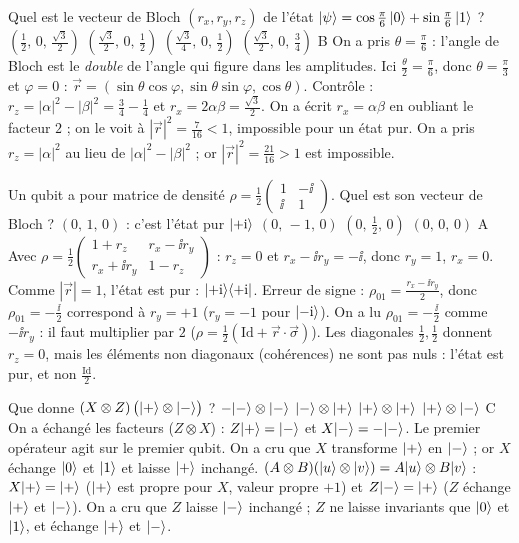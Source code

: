   {Quel est le vecteur de Bloch $(r_x,r_y,r_z)$ de l'état $|\psi\rangle=\cos\frac\pi6\,|0\rangle+\sin\frac\pi6\,|1\rangle$ ?}
  {$\left(\frac12,\,0,\,\frac{\sqrt3}{2}\right)$}
  {$\left(\frac{\sqrt3}{2},\,0,\,\frac12\right)$}
  {$\left(\frac{\sqrt3}{4},\,0,\,\frac12\right)$}
  {$\left(\frac{\sqrt3}{2},\,0,\,\frac34\right)$}
  {B}
\qcmx
  {On a pris $\theta=\frac\pi6$ : l'angle de Bloch est le \emph{double} de l'angle qui figure dans les amplitudes.}
  {Ici $\frac\theta2=\frac\pi6$, donc $\theta=\frac\pi3$ et $\varphi=0$ : $\vec r=(\sin\theta\cos\varphi,\sin\theta\sin\varphi,\cos\theta)$. Contrôle : $r_z=|\alpha|^2-|\beta|^2=\frac34-\frac14$ et $r_x=2\alpha\beta=\frac{\sqrt3}2$.}
  {On a écrit $r_x=\alpha\beta$ en oubliant le facteur $2$ ; on le voit à $|\vec r|^2=\frac7{16}<1$, impossible pour un état pur.}
  {On a pris $r_z=|\alpha|^2$ au lieu de $|\alpha|^2-|\beta|^2$ ; or $|\vec r|^2=\frac{21}{16}>1$ est impossible.}

  {Un qubit a pour matrice de densité $\rho=\frac12\begin{pmatrix}1&-\ii\\\ii&1\end{pmatrix}$. Quel est son vecteur de Bloch ?}
  {$(0,\,1,\,0)$ : c'est l'état pur $|{+}\mathrm{i}\rangle$}
  {$(0,\,-1,\,0)$}
  {$\left(0,\,\frac12,\,0\right)$}
  {$(0,\,0,\,0)$}
  {A}
\qcmx
  {Avec $\rho=\frac12\begin{pmatrix}1+r_z&r_x-\ii r_y\\r_x+\ii r_y&1-r_z\end{pmatrix}$ : $r_z=0$ et $r_x-\ii r_y=-\ii$, donc $r_y=1$, $r_x=0$. Comme $|\vec r|=1$, l'état est pur : $|{+}\mathrm{i}\rangle\langle {+}\mathrm{i}|$.}
  {Erreur de signe : $\rho_{01}=\frac{r_x-\ii r_y}{2}$, donc $\rho_{01}=-\frac\ii2$ correspond à $r_y=+1$ ($r_y=-1$ pour $|{-}\mathrm{i}\rangle$).}
  {On a lu $\rho_{01}=-\frac\ii2$ comme $-\ii r_y$ : il faut multiplier par $2$ ($\rho=\frac12(\mathrm{Id}+\vec r\cdot\vec\sigma)$).}
  {Les diagonales $\frac12,\frac12$ donnent $r_z=0$, mais les éléments non diagonaux (cohérences) ne sont pas nuls : l'état est pur, et non $\frac{\mathrm{Id}}2$.}

  {Que donne $(X\otimes Z)\,\big(|+\rangle\otimes|-\rangle\big)$ ?}
  {$-|-\rangle\otimes|-\rangle$}
  {$|-\rangle\otimes|+\rangle$}
  {$|+\rangle\otimes|+\rangle$}
  {$|+\rangle\otimes|-\rangle$}
  {C}
\qcmx
  {On a échangé les facteurs ($Z\otimes X$) : $Z|+\rangle=|-\rangle$ et $X|-\rangle=-|-\rangle$. Le premier opérateur agit sur le premier qubit.}
  {On a cru que $X$ transforme $|+\rangle$ en $|-\rangle$ ; or $X$ échange $|0\rangle$ et $|1\rangle$ et laisse $|+\rangle$ inchangé.}
  {$(A\otimes B)(|u\rangle\otimes|v\rangle)=A|u\rangle\otimes B|v\rangle$ : $X|+\rangle=|+\rangle$ ($|+\rangle$ est propre pour $X$, valeur propre $+1$) et $Z|-\rangle=|+\rangle$ ($Z$ échange $|+\rangle$ et $|-\rangle$).}
  {On a cru que $Z$ laisse $|-\rangle$ inchangé ; $Z$ ne laisse invariants que $|0\rangle$ et $|1\rangle$, et échange $|+\rangle$ et $|-\rangle$.}

